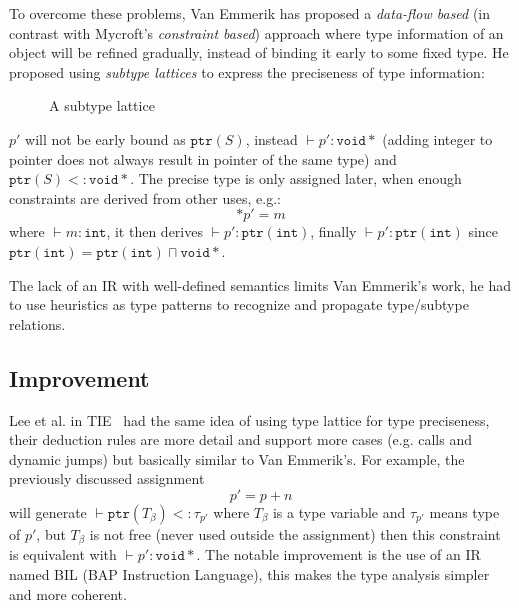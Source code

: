 \documentclass[compsoc,conference,a4paper,10pt,times]{IEEEtran}
\begin{document}
To overcome these problems, Van Emmerik has proposed a \emph{data-flow based}
(in contrast with Mycroft's \emph{constraint based}) approach where type information of an object will be refined gradually,
instead of binding it early to some fixed type. He proposed using \emph{subtype lattices} to express the
preciseness of type information:
\begin{figure}[h]
  \centering
  \caption{A subtype lattice}
\end{figure}
$p'$ will not be early bound as $\mathtt{ptr}(S)$, instead $\vdash p' \colon \mathtt{void*}$
(adding integer to pointer does not always result in pointer of the same type) and
$\mathtt{ptr}(S) <\colon \mathtt{void*}$. The precise type
is only assigned later, when enough constraints are derived from other uses, e.g.:
\begin{equation*}
  *{p'} = m
\end{equation*}
where $\vdash m \colon \mathtt{int}$, it then derives $\vdash p' \colon \mathtt{ptr}(\mathtt{int})$,
finally $\vdash p' \colon \mathtt{ptr}(\mathtt{int})$ since
$\mathtt{ptr}(\mathtt{int}) = \mathtt{ptr}(\mathtt{int}) \sqcap \mathtt{void*}$.

The lack of an IR with well-defined semantics limits Van Emmerik's work, he had to use heuristics as
type patterns to recognize and propagate type/subtype relations.

\subsection{Improvement}
\noindent
Lee et al. in TIE~\cite{lee_tie_2011} had the same idea of using type lattice for type preciseness,
their deduction rules are more detail and support more cases
(e.g. calls and dynamic jumps) but basically similar to Van Emmerik's. For example,
the previously discussed assignment
\begin{equation*}
  p' = p + n
\end{equation*}
will generate $\vdash \mathtt{ptr}(T_{\beta}) <\colon \tau_{p'}$ where $T_{\beta}$ is
a type variable and $\tau_{p'}$ means type of $p'$, but $T_{\beta}$ is not free (never used outside
the assignment) then this constraint is equivalent with $\vdash p' \colon \mathtt{void*}$. The notable
improvement is the use of an IR named BIL (BAP Instruction Language), this makes the type analysis
simpler and more coherent.
\end{document}
